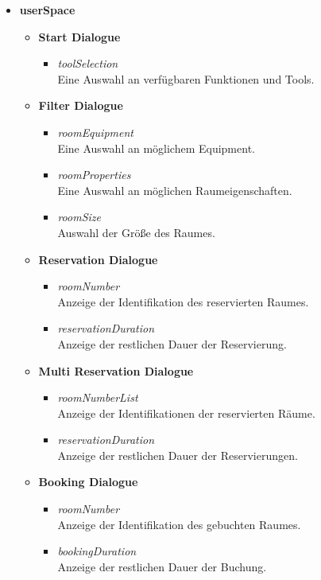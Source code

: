 
\begin{itemize}[noitemsep]
	\item \textbf{userSpace}
	\begin{itemize}
		\item \textbf{Start Dialogue}
		\begin{itemize}
			\item \textit{toolSelection}\\Eine Auswahl an verfügbaren Funktionen und Tools.
		\end{itemize}
		\item \textbf{Filter Dialogue}
		\begin{itemize}
			\item \textit{roomEquipment}\\Eine Auswahl an möglichem Equipment.
			\item \textit{roomProperties}\\Eine Auswahl an möglichen Raumeigenschaften.
			\item \textit{roomSize}\\Auswahl der Größe des Raumes.
		\end{itemize}
		\item \textbf{Reservation Dialogue}
		\begin{itemize}
			\item \textit{roomNumber}\\Anzeige der Identifikation des reservierten Raumes.
			\item \textit{reservationDuration}\\Anzeige der restlichen Dauer der Reservierung.
		\end{itemize}
		\item \textbf{Multi Reservation Dialogue}
		\begin{itemize}
			\item \textit{roomNumberList}\\Anzeige der Identifikationen der reservierten Räume.
			\item \textit{reservationDuration}\\Anzeige der restlichen Dauer der Reservierungen.
		\end{itemize}
		\item \textbf{Booking Dialogue}
		\begin{itemize}
			\item \textit{roomNumber}\\Anzeige der Identifikation des gebuchten Raumes.
			\item \textit{bookingDuration}\\Anzeige der restlichen Dauer der Buchung.

\end{itemize}
\end{itemize}
\end{itemize}
